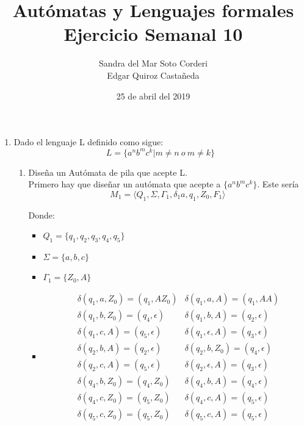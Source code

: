 \documentclass{article}
\begin{document}
    \title{
        Autómatas y Lenguajes formales \\
        Ejercicio Semanal 10
    }

    \author{
        Sandra del Mar Soto Corderi \\
        Edgar Quiroz Castañeda
    }

    \date{
        25 de abril del 2019
    }
    
    \maketitle

    \begin{enumerate}
        \item {
        Dado el lenguaje L definido como sigue:\\
        \begin{equation*}
        	L = \{a^nb^mc^k | m \neq n \ o \   m \neq k \}
        \end{equation*}
        
        
        \begin{enumerate}
        	\item {
        	Diseña un Autómata de pila que acepte L.\\
         	Primero hay que diseñar un autómata que acepte a $\{a^nb^mc^k\}$.
         	Este sería 
         	\[M_1 = \langle Q_1 , \Sigma, \Gamma_1 , \delta_1a, q_1 , Z_0,  F_1\rangle\]
         
	         Donde:
	         
	         \begin{itemize}
	         	\item {
	         		$Q_1 = \{q_1, q_2, q_3, q_4, q_5\}$
	         	}
	         	\item {
	         		$\Sigma = \{a, b,c\}$
	         	}
	         	\item {
	         		$\Gamma_1 = \{Z_0, A\}$
	         	}
	         	        					 
				\item {     		
					\begin{align*}
						&\delta (q_1, a, Z_0) = (q_1, AZ_0)
						&\delta (q_1, a, A) = (q_1, AA) \\
						&\delta (q_1, b, Z_0) = (q_4, \epsilon)
						&\delta (q_1, b, A) = (q_2, \epsilon) \\
						&\delta (q_1, c, A) = (q_5, \epsilon)
						&\delta (q_1, \epsilon, A) = (q_3, \epsilon) \\
						&\delta (q_2, b, A) = (q_2, \epsilon)
						&\delta (q_2, b, Z_0) = (q_4, \epsilon) \\
						&\delta (q_2, c, A) = (q_5, \epsilon)
						&\delta (q_2, \epsilon, A) = (q_3, \epsilon) \\
						&\delta (q_4, b, Z_0) = (q_4, Z_0)
						&\delta (q_4, b, A) = (q_4, \epsilon) \\
						&\delta (q_4, c, Z_0) = (q_5, Z_0)
						&\delta (q_4, c, A) = (q_5, \epsilon) \\
						&\delta (q_5, c, Z_0) = (q_5, Z_0)
						&\delta (q_5, c, A) = (q_5, \epsilon)
	         		\end{align*}
				}
				 

\end{itemize}}
\end{enumerate}}
\end{enumerate}
\end{document}

